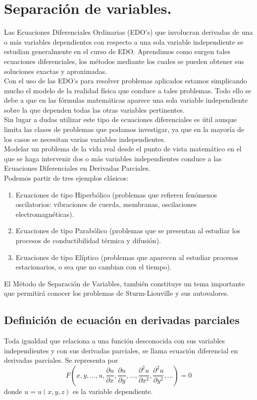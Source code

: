 \section{Separación de variables.}
Las Ecuaciones Diferenciales Ordinarias (EDO's) que involucran derivadas de una o más variables dependientes con respecto a una sola variable independiente se estudian generalmente en el curso de EDO.  Aprendimos como surgen tales ecuaciones
diferenciales, los métodos mediante los cuales se pueden obtener sus soluciones exactas y aproximadas.
\\
Con el uso de las EDO's para resolver problemas aplicados estamos simplicando mucho el modelo de la realidad física que conduce a tales problemas. Todo ello se debe a que en las fórmulas matemáticas aparece una sola variable independiente sobre la que dependen todas las otras variables pertinentes.
\\
Sin lugar a dudas utilizar este tipo de ecuaciones diferenciales es útil aunque limita las clases de problemas que podamos investigar, ya que en la mayoría de los casos se necesitan varias variables independientes.
\\
Modelar un problema de la vida real desde el punto de vista matemático en el que se haga intervenir dos o más variables independientes conduce a las Ecuaciones Diferenciales en Derivadas Parciales.
\\
Podemos partir de tres ejemplos clásicos:
\begin{enumerate}
\item Ecuaciones de tipo Hiperbólico (problemas que refieren fenómenos oscilatorios: vibraciones de cuerda, membranas, oscilaciones electromagnéticas).
\item Ecuaciones de tipo Parabólico (problemas que se presentan al estudiar los procesos de conductibilidad térmica y difusión).
\item Ecuaciones de tipo Elíptico (problemas que aparecen al estudiar procesos estacionarios, o sea que no cambian con el tiempo).
\end{enumerate}
El Método de Separación de Variables, también constituye un tema importante que permitirá conocer los problemas de Sturm-Liouville y sus autovalores.
\\
\subsection{Definición de ecuación en derivadas parciales}
Toda igualdad que relaciona a una función desconocida con sus variables independientes y con sus derivadas parciales, se llama ecuación diferencial en derivadas parciales. Se representa por
\[ F \left(x,y, \ldots, u, \dfrac{\partial u}{\partial x}, \dfrac{\partial u}{\partial y}, \ldots, \dfrac{\partial^{2} u}{\partial x^{2}}, \dfrac{\partial^{2} u}{\partial y^{2}}, \ldots \right) = 0 \]
donde $u=u(x,y,z)$ es la variable dependiente.
\\
